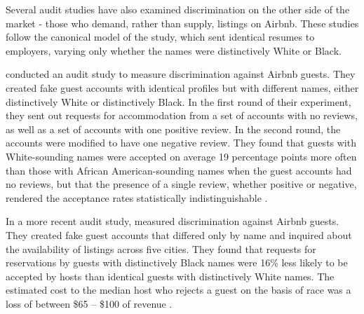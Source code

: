 Several audit studies have also examined discrimination on the other side of the market - those who demand, rather than supply, listings on Airbnb. These studies follow the canonical model of the \cite{bertrand} study, which sent identical resumes to employers, varying only whether the names were distinctively White or Black. 

\cite{cui} conducted an audit study to measure discrimination against Airbnb guests. They created fake guest accounts with identical profiles but with different names, either distinctively White or distinctively Black. In the first round of their experiment, they sent out requests for accommodation from a set of accounts with no reviews, as well as a set of accounts with one positive review. In the second round, the accounts were modified to have one negative review. They found that guests with White-sounding names were accepted on average 19 percentage points more often than those with African American-sounding names when the guest accounts had no reviews, but that the presence of a single review, whether positive or negative, rendered the acceptance rates statistically indistinguishable \citep{cui}.

In a more recent audit study, \cite{edelman2} measured discrimination against Airbnb guests. They created fake guest accounts that differed only by name and inquired about the availability of listings across five cities. They found that requests for reservations by guests with distinctively Black names were 16\% less likely to be accepted by hosts than identical guests with distinctively White names. The estimated cost to the median host who rejects a guest on the basis of race was a loss of between \$65 -- \$100 of revenue \citep{edelman2}.











